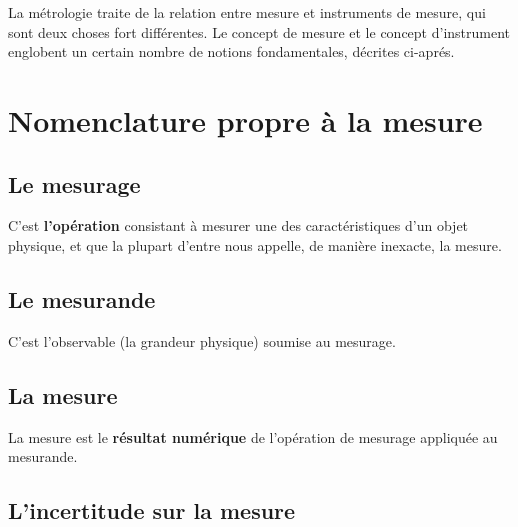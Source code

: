 \begin{center}
\end{center}

La métrologie traite de la relation entre mesure et instruments de mesure, qui sont deux choses fort différentes. Le concept de mesure et le concept d'instrument englobent un certain nombre de notions fondamentales, décrites ci-aprés.

\section{Nomenclature propre à la mesure}

\subsection{Le mesurage}

C'est \textbf{l'opération} consistant à mesurer une des caractéristiques d'un objet physique, et que la plupart d'entre nous appelle, de manière inexacte, la mesure.

\subsection{Le mesurande}

C'est l'observable (la grandeur physique) soumise au mesurage.

\subsection{La mesure}

La mesure est le \textbf{résultat numérique} de l'opération de mesurage appliquée au mesurande.

\subsection{L'incertitude sur la mesure}

